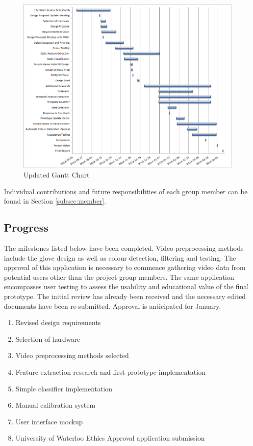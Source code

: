 \documentclass[12pt]{article}
\begin{document}
\begin{figure}[h!]
  \centering
  \includegraphics[scale=1]{Gantt.png}
  \caption{Updated Gantt Chart}
  \label{fig:gantt}
\end{figure}

Individual contributions and future responsibilities of each group member can be found in Section \ref{subsec:member}.

\subsection{Progress}
The milestones listed below have been completed. Video preprocessing methods include the glove design as well as colour detection, filtering and testing. The approval of this application is necessary to commence gathering video data from potential users other than the project group members. The same application encompasses user testing to assess the usability and educational value of the final prototype. The initial review has already been received and the necessary edited documents have been re-submitted. Approval is anticipated for January.

\begin{enumerate}
  \item Revised design requirements
  \item Selection of hardware
  \item Video preprocessing methods selected
  \item Feature extraction research and first prototype implementation
  \item Simple classifier implementation
  \item Manual calibration system
  \item User interface mockup
  \item University of Waterloo Ethics Approval application submission
\end{enumerate}
\end{document}
